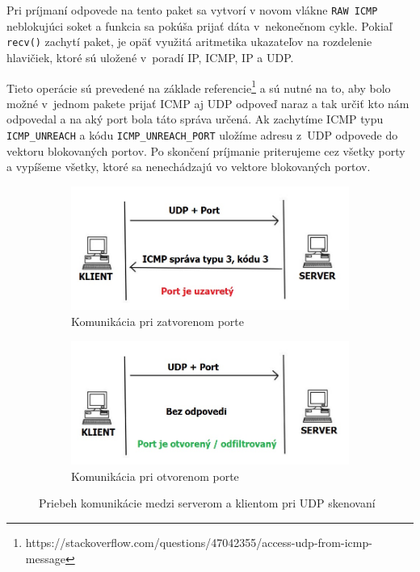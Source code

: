 Pri príjmaní odpovede na tento paket sa vytvorí v novom vlákne \texttt{RAW ICMP} neblokujúci soket a funkcia sa pokúša prijať dáta v~nekonečnom cykle. Pokiaľ \texttt{recv()} zachytí paket, je opäť využitá aritmetika ukazateľov na rozdelenie hlavičiek, ktoré sú uložené v~poradí IP, ICMP, IP a UDP. 



Tieto operácie sú prevedené na základe referencie\footnote{https://stackoverflow.com/questions/47042355/access-udp-from-icmp-message} a sú nutné na to, aby bolo možné v~jednom pakete prijať ICMP aj UDP odpoveď naraz a tak určiť kto nám odpovedal a na aký port bola táto správa určená. Ak zachytíme ICMP typu \texttt{ICMP\_UNREACH} a kódu \texttt{ICMP\_UNREACH\_PORT} uložíme adresu z~UDP odpovede do vektoru blokovaných portov. Po skončení príjmanie priterujeme cez všetky porty a vypíšeme všetky, ktoré sa nenechádzajú vo vektore blokovaných portov.

\begin{figure}[H]
	\centering
	\begin{subfigure}{.5\textwidth}
		\centering
		\includegraphics[width=0.375\paperwidth]{obrazky-figures/udp-closed.jpg}
		\caption{Komunikácia pri zatvorenom porte}
		\label{fig:udp-clos}
	\end{subfigure}%
	\begin{subfigure}{.5\textwidth}
		\centering
		\includegraphics[width=0.375\paperwidth]{obrazky-figures/udp-open.jpg}
		\caption{Komunikácia pri otvorenom porte}
		\label{fig:udp-open}
	\end{subfigure}
	\caption{Priebeh komunikácie medzi serverom a klientom pri UDP skenovaní}
	\label{fig:udp}
\end{figure}


